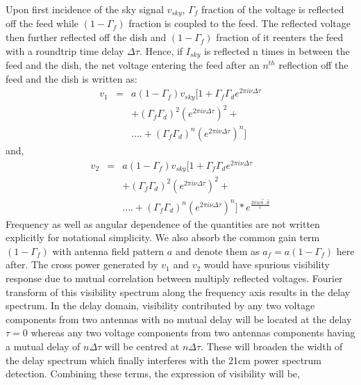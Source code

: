 \documentclass[twocolumn]{emulateapj}
\newcommand{\volt}{{v}}
\newcommand{\bmvolt}{{a}}
\newcommand{\thhat}{{\hat\theta}}
\newcommand{\fngexp}{{e^{\frac{2\pi i\nu\vec{b}\cdot\thhat}{c}}}}
\newcommand{\dfngexp}{{e^{2\pi i\nu \Delta \tau}}}
\begin{document}
Upon first incidence of the sky signal $\volt_{sky}$, $\Gamma_{f}$ fraction of the voltage is reflected off the feed while $(1-\Gamma_{f})$ fraction is coupled to the feed. The reflected voltage then further reflected off the dish and $(1-\Gamma_{f}) $ fraction of it reenters the feed with a roundtrip time delay $\Delta \tau$. Hence, if $I_{sky}$ is reflected n times in between the feed and the dish, the net voltage entering the feed after an
$n^{th}$ reflection off the feed and the dish is written as:
\begin{eqnarray}
\volt_{1} & = &  \bmvolt (1-\Gamma_{f}) \volt_{sky}[1+ \Gamma_{f}\Gamma_{d} \dfngexp \nonumber \\
	&& + (\Gamma_{f}\Gamma_{d})^2  (\dfngexp)^{2}+ \nonumber \\
&&  ....+ (\Gamma_{f}\Gamma_{d})^{n} (\dfngexp)^{n}] \nonumber
\end{eqnarray}
and, 
\begin{eqnarray}
\volt_{2} & = &  \bmvolt (1-\Gamma_{f}) \volt_{sky}[1+ \Gamma_{f}\Gamma_{d} \dfngexp \nonumber\\
&&+  (\Gamma_{f}\Gamma_{d})^2  (\dfngexp)^{2}+ \nonumber \\
&& ....+ (\Gamma_{f}\Gamma_{d})^{n} (\dfngexp)^{n}] \ast \fngexp \nonumber
\end{eqnarray}
Frequency as well as angular dependence of the quantities are not written explicitly for notational simplicity. We also absorb the common gain term $(1-\Gamma_{f})$ with antenna field pattern $a$ and denote them as $\bmvolt_{f}= \bmvolt(1-\Gamma_{f})$ here after. The cross power generated by $v_{1}$ and $v_{2}$ would have spurious visibility response due to mutual correlation between multiply reflected voltages. Fourier transform of this visibility spectrum along the frequency axis results in the delay spectrum. 
In the delay domain, visibility contributed by any two voltage components from two antennas with no mutual delay will be located at the delay $\tau = 0$ whereas any two voltage components from two antennas components having a mutual delay of $n\Delta \tau$ will be centred at $n\Delta \tau$. These will broaden the width of the delay spectrum which finally interferes with the 21cm power spectrum detection. Combining these terms, the expression of visibility will be,
 
\end{document}
